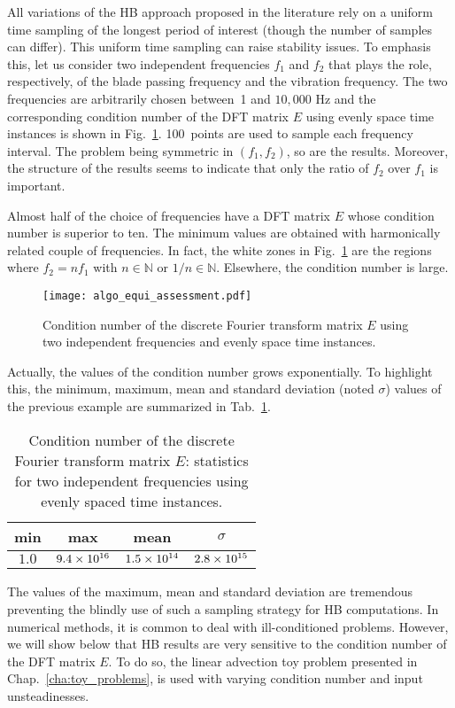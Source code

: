All variations of the HB approach proposed in the literature rely on 
a uniform time sampling of the longest period of interest 
(though the number of samples can differ). 
This uniform time sampling can raise stability issues.
To emphasis this, let us consider two independent frequencies $f_1$
and $f_2$ that plays the role, respectively, of the blade passing frequency and
the vibration frequency. The two frequencies are arbitrarily chosen between~1
and $10,000$ Hz and the corresponding
condition number of the DFT matrix $E$
using evenly space time instances is shown in Fig.~\ref{fig:algo_equi_assessment}.
100~points are used to sample each frequency interval.
The problem being symmetric in $(f_1, f_2)$, so are the results.
Moreover, the structure of the results seems to indicate that only the
ratio of $f_2$ over $f_1$ is important.

Almost half of the choice of frequencies have a DFT matrix $E$
whose condition number is superior to ten.
The minimum values are obtained with harmonically related couple
of frequencies. In fact, the white zones in Fig.~\ref{fig:algo_equi_assessment}
are the regions where $f_2 = n f_1$ with $n \in \mathbb{N}$ or $1/n \in \mathbb{N}$.
Elsewhere, the condition number is large. 
\begin{figure}[htb]
  \centering
  \texttt{[image: algo\_equi\_assessment.pdf]}
  \caption{Condition number of the discrete Fourier transform matrix $E$
  using two independent frequencies and evenly space time instances.}
  \label{fig:algo_equi_assessment}
\end{figure}

Actually, the values of the condition number grows exponentially.
To highlight this, the minimum, maximum, mean and 
standard deviation (noted $\sigma$) values of the
previous example are summarized in Tab.~\ref{tab:hb_algo_equi}.
\begin{table}[htb]
  \centering
  \begin{tabular}{cccc}
    \toprule
    min & max & mean & $\sigma$ \\
    \midrule
    $1.0$ & $9.4\times 10^{16}$ & $1.5\times 10^{14}$ & $2.8\times 10^{15}$ \\
    \bottomrule
  \end{tabular}
  \caption{Condition number of the discrete Fourier transform matrix $E$: 
  statistics for two independent frequencies using evenly spaced time instances.}
  \label{tab:hb_algo_equi}
\end{table}  
The values of the maximum, mean and standard deviation are tremendous
preventing the blindly use of such a sampling strategy for 
HB computations.
In numerical methods, it is common to deal with ill-conditioned
problems. However, we will show below that HB results are 
very sensitive to the condition number of the DFT matrix $E$.
To do so, the linear advection toy problem
presented in Chap.~\ref{cha:toy_problems},
is used with varying condition number and input unsteadinesses.
